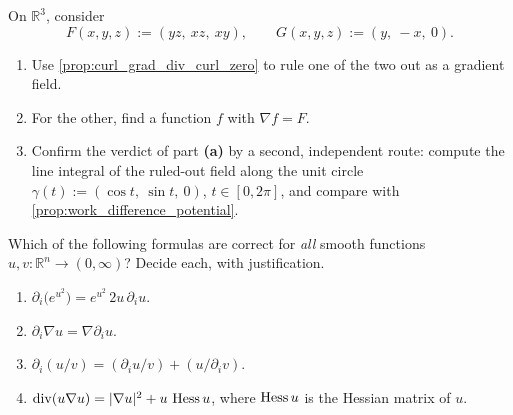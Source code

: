 \begin{aiexercise}
\label{ex:ai_which_fields_are_gradients}
On $\mathbb{R}^3$, consider
\[F(x,y,z) := (yz,\ xz,\ xy), \qquad G(x,y,z) := (y,\ -x,\ 0).\]
\begin{enumerate}[label=\textbf{(\alph*)}]
  \item Use \cref{prop:curl_grad_div_curl_zero} to rule one of the two out as a gradient field.
  \item For the other, find a function $f$ with $\nabla f = F$.
  \item Confirm the verdict of part \textbf{(a)} by a second, independent route: compute the
    line integral of the ruled-out field along the unit circle
    $\gamma(t) := (\cos t,\ \sin t,\ 0)$, $t \in [0,2\pi]$, and compare with
    \cref{prop:work_difference_potential}.
\end{enumerate}
\end{aiexercise}

\begin{exercise}
\label{ex:differential_identities_true_false}
Which of the following formulas are correct for \emph{all} smooth functions
$u,v : \mathbb{R}^n \to (0,\infty)$? Decide each, with justification.
\begin{enumerate}[label=\textbf{(\alph*)}]
  \item $\partial_i\big(e^{u^2}\big) = e^{u^2}\,2u\,\partial_i u$.
  \item $\partial_i \nabla u = \nabla \partial_i u$.
  \item $\partial_i(u/v) = (\partial_i u / v) + (u / \partial_i v)$.
  \item $\operatorname{div}(u\nabla u) = \lvert\nabla u\rvert^2 + u\,\operatorname{Hess} u$, where $\operatorname{Hess} u$ is the Hessian
    matrix of $u$.
\end{enumerate}
\end{exercise}

